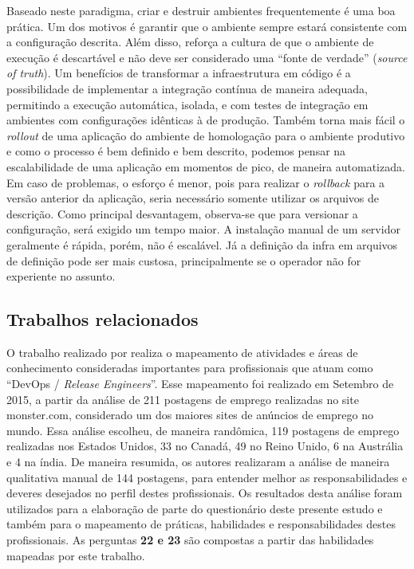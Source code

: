 \documentclass[twoside,english,brazilian]{UNISINOSartigo}
\begin{document}
Baseado neste paradigma, criar e destruir ambientes frequentemente é uma boa prática. Um dos motivos é garantir que o ambiente sempre estará consistente com a configuração descrita. Além disso, reforça a cultura de que o ambiente de execução é descartável e não deve ser considerado uma ``fonte de verdade'' (\textit{source of truth}).
Um benefícios de transformar a infraestrutura em código é a possibilidade de implementar a integração contínua de maneira adequada, permitindo a execução automática, isolada, e com testes de integração em ambientes com configurações idênticas à de produção. Também torna mais fácil o \textit{rollout} de uma aplicação do ambiente de homologação para o ambiente produtivo e como o processo é bem definido e bem descrito, podemos pensar na escalabilidade de uma aplicação em momentos de pico, de maneira automatizada. Em caso de problemas, o esforço é menor, pois para realizar o \textit{rollback} para a versão anterior da aplicação, seria necessário somente utilizar os arquivos de descrição. Como principal desvantagem, observa-se que para versionar a configuração, será exigido um tempo maior. A instalação manual de um servidor geralmente é rápida, porém, não é escalável. Já a definição da infra em arquivos de definição pode ser mais custosa, principalmente se o operador não for experiente no assunto.

\subsection{Trabalhos relacionados}
O trabalho realizado por  realiza o mapeamento de atividades e áreas de conhecimento consideradas importantes para profissionais que atuam como ``DevOps / \textit{Release Engineers}''. Esse mapeamento foi realizado em Setembro de 2015, a partir da análise de 211 postagens de emprego realizadas no site monster.com, considerado um dos maiores sites de anúncios de emprego no mundo. Essa análise escolheu, de maneira randômica, 119 postagens de emprego realizadas nos Estados Unidos, 33 no Canadá, 49 no Reino Unido, 6 na Austrália e 4 na índia.  De maneira resumida, os autores realizaram a análise de maneira qualitativa manual de 144 postagens, para entender melhor as responsabilidades e deveres desejados no perfil destes profissionais. Os resultados desta análise foram utilizados para a elaboração de parte do questionário deste presente estudo e também para o mapeamento de práticas, habilidades e responsabilidades destes profissionais. As perguntas \textbf{22 e 23} são compostas a partir das habilidades mapeadas por este trabalho.
\end{document}
